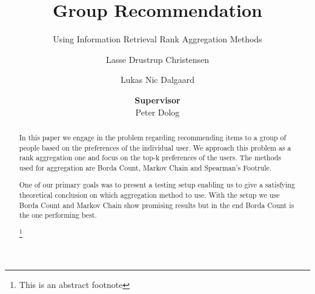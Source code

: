 \documentclass[sigplan]{acmart}
\begin{document}
\title{Group Recommendation}
\subtitle{Using Information Retrieval Rank Aggregation Methods}

\author{Lasse Drustrup Christensen}

\author{Lukas Nic Dalgaard}

\author{\textbf{Supervisor}\\ Peter Dolog}



\begin{abstract}
In this paper we engage in the problem regarding recommending items to a group of people based on the preferences of the individual user. We approach this problem as a rank aggregation one and focus on the top-k preferences of the users.
The methods used for aggregation are Borda Count, Markov Chain and Spearman's Footrule. 

One of our primary goals was to present a testing setup enabling us to give a satisfying theoretical conclusion on which aggregation method to use. With the setup we use Borda Count and Markov Chain show promising results but in the end Borda Count is the one performing best.

\footnote{This is an abstract footnote}
\end{abstract}




\maketitle








 


\end{document}
